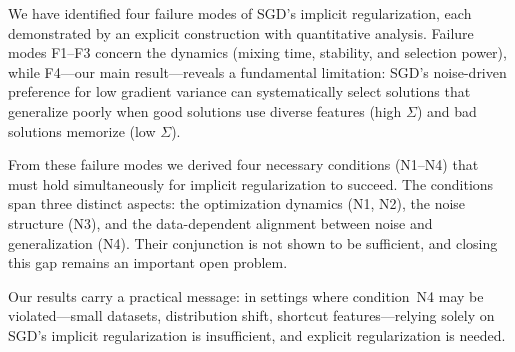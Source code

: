 \documentclass[11pt,a4paper]{article}
\begin{document}
We have identified four failure modes of SGD's implicit regularization, each
demonstrated by an explicit construction with quantitative analysis.  Failure
modes F1--F3 concern the dynamics (mixing time, stability, and selection
power), while F4---our main result---reveals a fundamental limitation: SGD's
noise-driven preference for low gradient variance can systematically select
solutions that generalize poorly when good solutions use diverse features
(high $\Sigma$) and bad solutions memorize (low $\Sigma$).

From these failure modes we derived four necessary conditions (N1--N4) that
must hold simultaneously for implicit regularization to succeed.  The
conditions span three distinct aspects: the optimization dynamics (N1, N2),
the noise structure (N3), and the data-dependent alignment between noise and
generalization (N4).  Their conjunction is not shown to be sufficient, and
closing this gap remains an important open problem.

Our results carry a practical message: in settings where condition~N4 may be
violated---small datasets, distribution shift, shortcut features---relying
solely on SGD's implicit regularization is insufficient, and explicit
regularization is needed.
\end{document}
